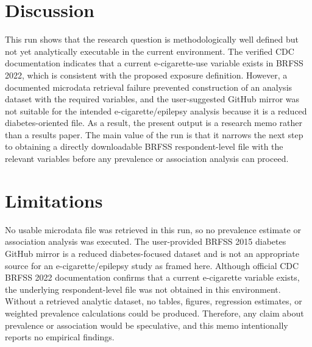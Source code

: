 \documentclass[11pt]{article}
\begin{document}
\section{Discussion}
This run shows that the research question is methodologically well defined but not yet analytically executable in the current environment. The verified CDC documentation indicates that a current e-cigarette-use variable exists in BRFSS 2022, which is consistent with the proposed exposure definition. However, a documented microdata retrieval failure prevented construction of an analysis dataset with the required variables, and the user-suggested GitHub mirror was not suitable for the intended e-cigarette/epilepsy analysis because it is a reduced diabetes-oriented file. As a result, the present output is a research memo rather than a results paper. The main value of the run is that it narrows the next step to obtaining a directly downloadable BRFSS respondent-level file with the relevant variables before any prevalence or association analysis can proceed. \cite{ref1} \cite{ref2} \cite{ref3}

\section{Limitations}
No usable microdata file was retrieved in this run, so no prevalence estimate or association analysis was executed. The user-provided BRFSS 2015 diabetes GitHub mirror is a reduced diabetes-focused dataset and is not an appropriate source for an e-cigarette/epilepsy study as framed here. Although official CDC BRFSS 2022 documentation confirms that a current e-cigarette variable exists, the underlying respondent-level file was not obtained in this environment. Without a retrieved analytic dataset, no tables, figures, regression estimates, or weighted prevalence calculations could be produced. Therefore, any claim about prevalence or association would be speculative, and this memo intentionally reports no empirical findings.



\end{document}
